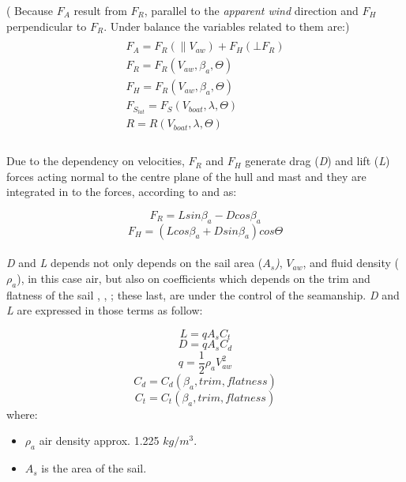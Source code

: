 ( Because $F_{A}$ result from $F_{R}$, parallel to the \textit{apparent wind} direction and $F_{H}$ perpendicular to $F_{R}$. Under balance the variables related to them are:)
\begin{multline}
\\
F_{A}=F_{R}(\parallel V_{aw}) + F_{H}(\bot F_{R} )\\
F_{R}=F_{R}(V_{aw},\beta_{a}, \Theta) \\
F_{H}=F_{R}(V_{aw},\beta_{a}, \Theta) \\
F_{S_{lat}}=F_{S}(V_{boat},\lambda, \Theta) \\
R=R(V_{boat},\lambda, \Theta)\\  
\end{multline}
\\
Due to the dependency on velocities, $F_{R}$ and $F_{H}$ generate drag (\textit{D}) and lift (\textit{L}) forces acting normal to the centre plane of the hull and mast and they are integrated in to the forces, according to \cite{philpott1993yacht} and \cite{claughton1998sailing} as: \par 
\begin{equation} \label{eq:Fr_LD}
    F_{R}=L sin \beta_{a} - D cos \beta_{a}
\end{equation}
\begin{equation} \label{eq:Fh_LD}
    F_{H}=(L cos \beta_{a} + D sin \beta_{a}) cos\Theta
\end{equation}
\\ \textit{D} and \textit{L} depends not only depends on  the sail area (\textit{$A_{s}$)}, $V_{aw}$, and fluid density ($\rho_{a}$), in this case air, but also on coefficients which depends on the trim and flatness of the sail \cite{philpott1993yacht}, \cite{carrico17symp}, \cite{day2017performance}; these last, are under the control of the seamanship. \textit{D} and \textit{L}  are expressed in those terms as follow: \par
\begin{equation} \label{eq:Lift}
  L=qA_{s}C_{t}  
\end{equation}
\begin{equation} \label{eq:Draf}
    D=qA_{s}C_{d}  
\end{equation}
\begin{equation} \label{eq:dynamic_press}
    q=\frac{1}{2}\rho_{a} V_{aw}^2
\end{equation}
\begin{equation} \label{eq:Cd}
    C_{d}=C_{d}(\beta_{a},trim, flatness)
\end{equation}
\begin{equation} \label{eq:Ct}
    C_{t}=C_{t}(\beta_{a},trim, flatness)
\end{equation}
where:
\begin{itemize} \label{ae_symbols}
    \item $\rho_{a}$ air density approx. 1.225 $kg/m^3$.
    \item $A_{s}$ is the area of the sail.
\end{itemize}

